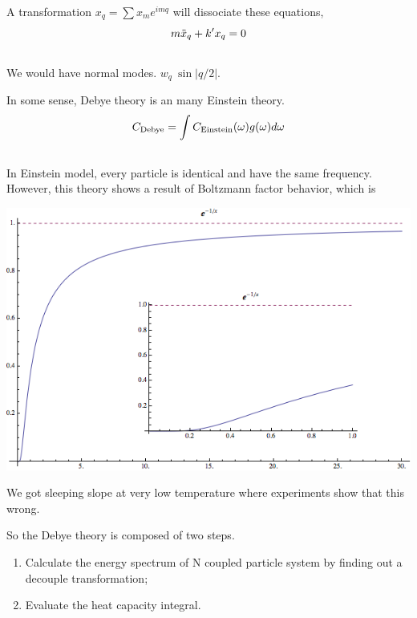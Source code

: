 \documentclass[letterpaper,10pt,english]{sphinxmanual}
\begin{document}
A transformation $x_q = \sum x_m e^{i m q}$ will dissociate these equations,
\begin{gather}
\begin{split}m \ddot x_q + k' x_q =0\end{split}\notag\\\begin{split}\end{split}\notag
\end{gather}
We would have normal modes. $w_q ~ \sin|q/2|$.

In some sense, Debye theory is an many Einstein theory.
\begin{gather}
\begin{split}C_{\mathrm{Debye}} = \int C_{\mathrm{Einstein}} (\omega) g(\omega) d \omega\end{split}\notag\\\begin{split}\end{split}\notag
\end{gather}
In Einstein model, every particle is identical and have the same frequency. However, this theory shows a result of Boltzmann factor behavior, which is

{\hfill\includegraphics{boltzfactor.png}\hfill}

We got sleeping slope at very low temperature where experiments show that this wrong.

So the Debye theory is composed of two steps.
\begin{enumerate}
\item {} 
Calculate the energy spectrum of N coupled particle system by finding out a decouple transformation;

\item {} 
Evaluate the heat capacity integral.

\end{enumerate}
\end{document}
